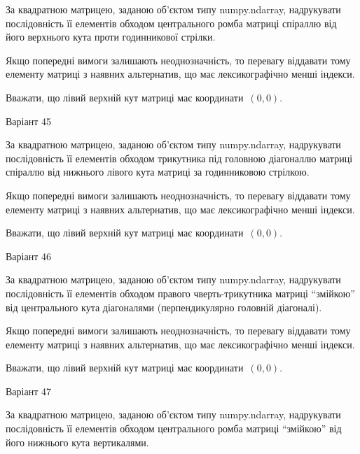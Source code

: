\documentclass[11pt]{article}
\begin{document}
За квадратною матрицею, заданою об'єктом типу numpy.ndarray, надрукувати послідовність її елементів обходом центрального ромба матриці спіраллю від його верхнього кута проти годинникової стрілки.

\vspace{2mm}
Якщо попередні вимоги залишають неоднозначність, то перевагу віддавати тому елементу матриці з наявних альтернатив, що має лексикографічно менші індекси.

Вважати, що лівий верхній кут матриці має координати~$(0,0)$.



{\Large \center  Варіант  45\par \bigskip\bigskip}

За квадратною матрицею, заданою об'єктом типу numpy.ndarray, надрукувати послідовність її елементів обходом трикутника під головною діагоналлю матриці спіраллю від нижнього лівого кута матриці за годинниковою стрілкою.

\vspace{2mm}
Якщо попередні вимоги залишають неоднозначність, то перевагу віддавати тому елементу матриці з наявних альтернатив, що має лексикографічно менші індекси.

Вважати, що лівий верхній кут матриці має координати~$(0,0)$.



{\Large \center  Варіант  46\par \bigskip\bigskip}

За квадратною матрицею, заданою об'єктом типу numpy.ndarray, надрукувати послідовність її елементів обходом правого чверть-трикутника матриці ``змійкою'' від центрального кута діагоналями (перпендикулярно головній діагоналі).

\vspace{2mm}
Якщо попередні вимоги залишають неоднозначність, то перевагу віддавати тому елементу матриці з наявних альтернатив, що має лексикографічно менші індекси.

Вважати, що лівий верхній кут матриці має координати~$(0,0)$.



{\Large \center  Варіант  47\par \bigskip\bigskip}

За квадратною матрицею, заданою об'єктом типу numpy.ndarray, надрукувати послідовність її елементів обходом центрального ромба матриці ``змійкою'' від його нижнього кута вертикалями.
\end{document}
